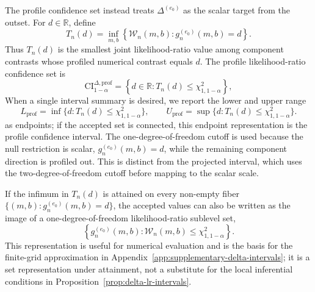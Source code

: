 \documentclass[11pt]{article}
\begin{document}
The profile confidence set instead treats $\Delta^{(e_0)}$ as the scalar target from the outset. For $d\in\mathbb{R}$, define
\begin{equation*}
  T_n(d)
  =
  \inf_{m,b}
  \left\{
    \mathcal{W}_n(m,b):
    g_n^{(e_0)}(m,b)=d
  \right\}.
\end{equation*}
Thus $T_n(d)$ is the smallest joint likelihood-ratio value among component contrasts whose profiled numerical contrast equals $d$. The profile likelihood-ratio confidence set is
\begin{equation}
  \mathrm{CI}^{\Delta,\mathrm{prof}}_{1-\alpha}
  =
  \left\{
    d\in\mathbb{R}:T_n(d)\leq\chi^2_{1,1-\alpha}
  \right\},
  \label{eq:profile-delta-ci}
\end{equation}
When a single interval summary is desired, we report the lower and upper range
\[
  L_{\mathrm{prof}}
  =
  \inf\{d:T_n(d)\leq\chi^2_{1,1-\alpha}\},
  \qquad
  U_{\mathrm{prof}}
  =
  \sup\{d:T_n(d)\leq\chi^2_{1,1-\alpha}\}.
\]
as endpoints; if the accepted set is connected, this endpoint representation is the profile confidence interval.
The one-degree-of-freedom cutoff is used because the null restriction is scalar, $g_n^{(e_0)}(m,b)=d$, while the remaining component direction is profiled out. This is distinct from the projected interval, which uses the two-degree-of-freedom cutoff before mapping to the scalar scale.

If the infimum in $T_n(d)$ is attained on every non-empty fiber $\{(m,b):g_n^{(e_0)}(m,b)=d\}$, the accepted values can also be written as the image of a one-degree-of-freedom likelihood-ratio sublevel set,
\[
  \left\{
    g_n^{(e_0)}(m,b):
    \mathcal{W}_n(m,b)\leq\chi^2_{1,1-\alpha}
  \right\}.
\]
This representation is useful for numerical evaluation and is the basis for the finite-grid approximation in Appendix~\ref{app:supplementary-delta-intervals}; it is a set representation under attainment, not a substitute for the local inferential conditions in Proposition~\ref{prop:delta-lr-intervals}.
\end{document}
